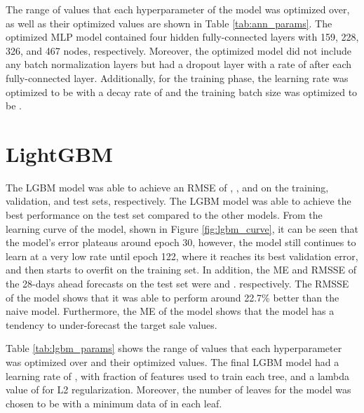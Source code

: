 The range of values that each hyperparameter of the model was optimized over, as well as their optimized values are shown in Table \ref{tab:ann_params}. 
The optimized MLP model contained four hidden fully-connected layers with 159, 228, 326, and 467 nodes, respectively.
Moreover, the optimized model did not include any batch normalization layers but had a dropout layer with a rate of \annParamsDropout{} after each fully-connected layer.
Additionally, for the training phase, the learning rate was optimized to be \annParamsLR{} with a decay rate of \annParamsDecay{} and the training batch size was optimized to be \annParamsBatch{}.


\section{LightGBM}
The LGBM model was able to achieve an RMSE of \lgbmTrnRMSE{}, \lgbmValRMSE{}, and \lgbmTstRMSE{} on the training, validation, and test sets, respectively.
The LGBM model was able to achieve the best performance on the test set compared to the other models.
From the learning curve of the model, shown in Figure \ref{fig:lgbm_curve}, it can be seen that the model's error plateaus around epoch 30, however, the model still continues to learn at a very low rate until epoch 122, where it reaches its best validation error, and then starts to overfit on the training set.
In addition, the ME and RMSSE of the 28-days ahead forecasts on the test set were \lgbmTstMonME{} and \lgbmTstMonRMSSE{}. respectively.
The RMSSE of the model shows that it was able to perform around 22.7\% better than the naive model.
Furthermore, the ME of the model shows that the model has a tendency to under-forecast the target sale values.

Table \ref{tab:lgbm_params} shows the range of values that each hyperparameter was optimized over and their optimized values.
The final LGBM model had a learning rate of \lgbmParamsLR{}, with \lgbmParamsFeatFrac{} fraction of features used to train each tree, and a lambda value of \lgbmParamsLambda{} for L2 regularization.
Moreover, the number of leaves for the model was chosen to be \lgbmParamsNleaves{} with a minimum data of \lgbmParamsMinData{} in each leaf.


